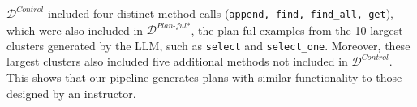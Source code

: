 \(\mathcal{D}^{\textit{Control}}\) included four distinct method calls (\texttt{append, find, find\_all, get}), which were also included in \(\mathcal{D}^{\textit{Plan-ful*}}\), the plan-ful examples from the 10 largest clusters generated by the LLM, such as \texttt{select} and \texttt{select\_one}. Moreover, these largest clusters also included five additional methods not included in \(\mathcal{D}^{\textit{Control}}\).
This shows that our pipeline generates plans with similar functionality to those designed by an instructor. 






